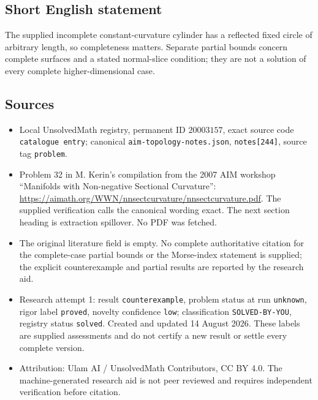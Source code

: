 \documentclass[11pt]{article}
\begin{document}
\subsection{Short English statement}
The supplied incomplete constant-curvature cylinder has a reflected fixed circle of arbitrary length, so completeness matters. Separate partial bounds concern complete surfaces and a stated normal-slice condition; they are not a solution of every complete higher-dimensional case.
\subsection{Sources}
\begin{itemize}
\item Local UnsolvedMath registry, permanent ID \(20003157\), exact source code \texttt{catalogue entry}; canonical \texttt{aim-topology-notes.json}, \texttt{notes[244]}, source tag \texttt{problem}.
\item Problem 32 in M. Kerin's compilation from the 2007 AIM workshop ``Manifolds with Non-negative Sectional Curvature'': \url{https://aimath.org/WWN/nnsectcurvature/nnsectcurvature.pdf}. The supplied verification calls the canonical wording exact. The next section heading is extraction spillover. No PDF was fetched.
\item The original literature field is empty. No complete authoritative citation for the complete-case partial bounds or the Morse-index statement is supplied; the explicit counterexample and partial results are reported by the research aid.
\item Research attempt 1: result \texttt{counterexample}, problem status at run \texttt{unknown}, rigor label \texttt{proved}, novelty confidence \texttt{low}; classification \texttt{SOLVED-BY-YOU}, registry status \texttt{solved}. Created and updated 14 August 2026. These labels are supplied assessments and do not certify a new result or settle every complete version.
\item Attribution: Ulam AI / UnsolvedMath Contributors, CC BY 4.0. The machine-generated research aid is not peer reviewed and requires independent verification before citation.
\end{itemize}
\end{document}
